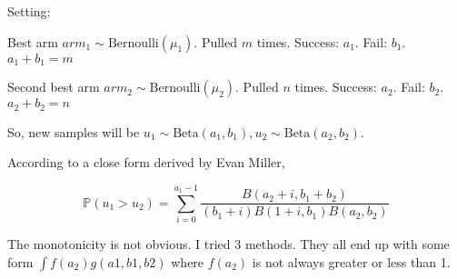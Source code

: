 \documentclass[fleqn]{article}
\def\PP{{\mathbb P}}\def\QQ{{\mathbb Q}}\def\RR{{\mathbb R}}
\begin{document}
Setting:

Best arm $arm_1\sim\text{Bernoulli}(\mu_1)$. Pulled $m$ times. Success: $a_1$. Fail: $b_1$. $a_1+b_1=m$

Second best arm $arm_2\sim\text{Bernoulli}(\mu_2)$. Pulled $n$ times. Success: $a_2$. Fail: $b_2$. $a_2+b_2=n$
\medskip

So, new samples will be $u_1\sim\text{Beta}(a_1,b_1), u_2\sim\text{Beta}(a_2,b_2)$. 
\bigskip

According to a close form derived by Evan Miller, 

\[
\PP(u_1>u_2) = \sum\limits_{i=0}^{a_1-1}\frac{B(a_2+i, b_1+b_2)}{(b_1+i)B(1+i,b_1)B(a_2,b_2)}
\]

The monotonicity is not obvious. I tried 3 methods. They all end up with some form $\int f(a_2)g(a1,b1,b2)$ where $f(a_2)$ is not always greater or less than 1.
\end{document}
